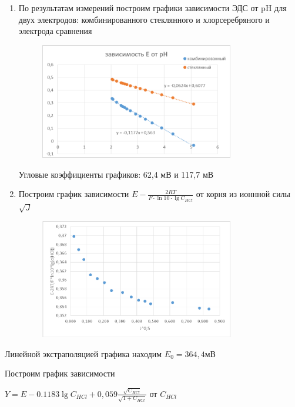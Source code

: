 \documentclass[a4paper, 12pt]{article}
\begin{document}
\begin{enumerate}
\item
По результатам измерений построим графики зависимости ЭДС от pH для двух электродов: комбинированного стеклянного и хлорсеребряного и электрода сравнения\\

\begin{figure}[h!]
	\centering
	\caption{}
\includegraphics[width=0.8\textwidth]{image003.png}
\end{figure}
Угловые коэффициенты графиков: 62,4 мВ и 117,7 мВ

\item
Построим график зависимости $E - \frac{2RT}{F\cdot \ln{10}\cdot \lg{C_{HCl}}}$ от корня из ионнной силы $\sqrt{J}$\\

\begin{figure}[h!]
	\centering
	\caption{}
\includegraphics[width=0.8\textwidth]{image005.png}
\end{figure}
\end{enumerate}
Линейной экстраполяцией графика находим $E_0 = 364,4 \text{мВ}$

Построим график зависимости

$Y = E - 0.1183\lg{C_{HCl}} + 0,059 \frac{\sqrt{C_{HCl}}}{\sqrt{1+ C_{HCl}}}$ от $C_{HCl}$\\
\end{document}
